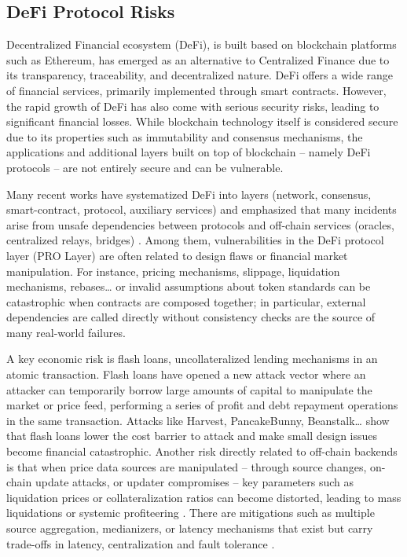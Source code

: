 \subsection{DeFi Protocol Risks}
Decentralized Financial ecosystem (DeFi), is built based on blockchain platforms such as Ethereum, has emerged as an alternative to Centralized Finance due to its transparency, traceability, and decentralized nature. DeFi offers a wide range of financial services, primarily implemented through smart contracts. However, the rapid growth of DeFi has also come with serious security risks, leading to significant financial losses. While blockchain technology itself is considered secure due to its properties such as immutability and consensus mechanisms, the applications and additional layers built on top of blockchain – namely DeFi protocols – are not entirely secure and can be vulnerable.

Many recent works have systematized DeFi into layers (network, consensus, smart-contract, protocol, auxiliary services) and emphasized that many incidents arise from unsafe dependencies between protocols and off-chain services (oracles, centralized relays, bridges) \cite{zhou2023sok}. Among them, vulnerabilities in the DeFi protocol layer (PRO Layer) are often related to design flaws or financial market manipulation. For instance, pricing mechanisms, slippage, liquidation mechanisms, rebases… or invalid assumptions about token standards can be catastrophic when contracts are composed together; in particular, external dependencies are called directly without consistency checks are the source of many real-world failures. \cite{zhou2023sok}

A key economic risk is flash loans, uncollateralized lending mechanisms in an atomic transaction. Flash loans have opened a new attack vector where an attacker can temporarily borrow large amounts of capital to manipulate the market or price feed, performing a series of profit and debt repayment operations in the same transaction. Attacks like Harvest, PancakeBunny, Beanstalk… \cite{zhou2023sok, li2022securitydefi} show that flash loans lower the cost barrier to attack and make small design issues become financial catastrophic. Another risk directly related to off-chain backends is that when price data sources are manipulated – through source changes, on-chain update attacks, or updater compromises – key parameters such as liquidation prices or collateralization ratios can become distorted, leading to mass liquidations or systemic profiteering \cite{li2022securitydefi}. There are mitigations such as multiple source aggregation, medianizers, or latency mechanisms that exist but carry trade-offs in latency, centralization and fault tolerance \cite{zhou2023sok, li2022securitydefi}.

